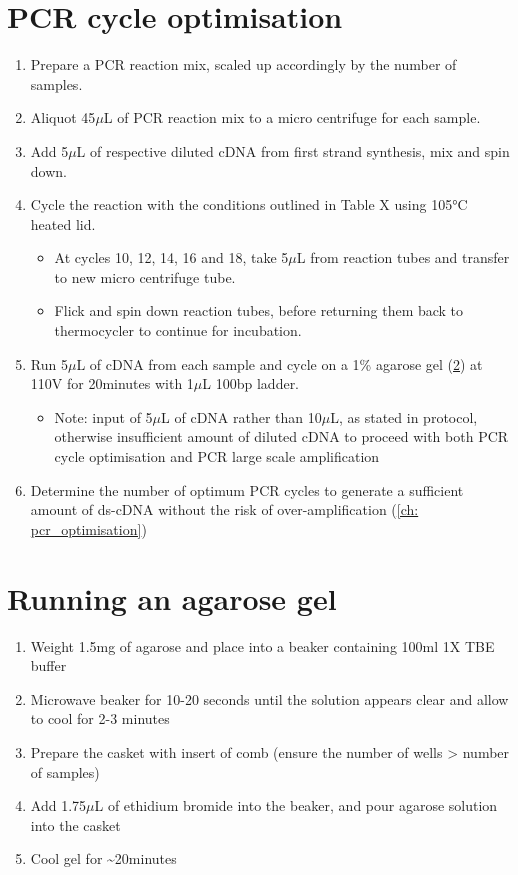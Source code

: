 \section{PCR cycle optimisation} 
\label{proto: pcr_cycle}
\begin{enumerate}
	\item Prepare a PCR reaction mix, scaled up accordingly by the number of samples.
	\item Aliquot 45$\mu$L of PCR reaction mix to a micro centrifuge for each sample. 
	\item Add 5$\mu$L of respective diluted cDNA from first strand synthesis, mix and spin down. 
	\item Cycle the reaction with the conditions outlined in Table X using 105°C heated lid.
	\begin{itemize}
		\item At cycles 10, 12, 14, 16 and 18, take 5$\mu$L from reaction tubes and transfer to new micro centrifuge tube.
		\item Flick and spin down reaction tubes, before returning them back to thermocycler to continue for incubation.  
	\end{itemize}
	\item Run 5$\mu$L of cDNA from each sample and cycle on a 1\% agarose gel (\cref{Isoseq_Protocol_running_agarose_gel}) at 110V for 20minutes with 1$\mu$L 100bp ladder.
	\begin{itemize}
		\item Note: input of 5$\mu$L of cDNA rather than 10$\mu$L, as stated in protocol, otherwise insufficient amount of diluted cDNA to proceed with both PCR cycle optimisation and PCR large scale amplification
	\end{itemize} 
	\item Determine the number of optimum PCR cycles to generate a sufficient amount of ds-cDNA without the risk of over-amplification (\cref{ch: pcr_optimisation})
\end{enumerate} 
	
\section{Running an agarose gel}
\label{Isoseq_Protocol_running_agarose_gel}
\begin{enumerate}
	\item Weight 1.5mg of agarose and place into a beaker containing 100ml 1X TBE buffer 
	\item Microwave beaker for 10-20 seconds until the solution appears clear and allow to cool for 2-3 minutes 
	\item Prepare the casket with insert of comb (ensure the number of wells > number of samples)
	\item Add 1.75$\mu$L of ethidium bromide into the beaker, and pour agarose solution into the casket 
	\item Cool gel for \textasciitilde20minutes
\end{enumerate} 

